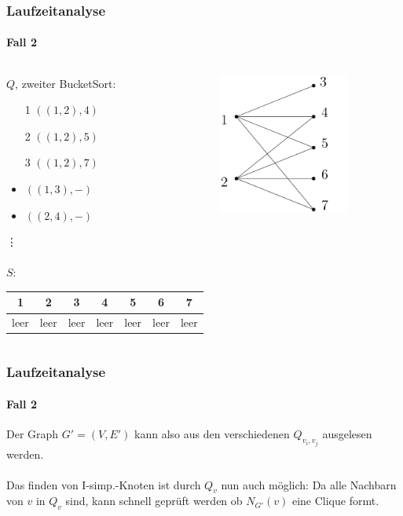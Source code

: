 \begin{frame}[t]
\frametitle{Laufzeitanalyse}
\framesubtitle{Fall 2}

\begin{columns}
	\begin{block}{$Q$, zweiter BucketSort:}
		\begin{itemize}
			\item[1] $((1,2), 4)$
			\item[2] $((1,2), 5)$
			\item[3] $((1,2), 7)$
			\item $((1,3), -)$
			\item $((2,4), -)$
		\end{itemize}
	\vdots
	\ \\
	\ \\
	$S$: \\
	\begin{tabular}{| c | c | c | c | c | c | c |}
		\hline
		1 & 2 & 3 & 4 & 5 & 6 & 7 \\
		\hline
		{\scriptsize leer} & {\scriptsize leer} & {\scriptsize leer} & {\scriptsize leer} & {\scriptsize leer} & {\scriptsize leer} & {\scriptsize leer} \\
		\hline
	\end{tabular}
	\end{block}
	
	\includegraphics[width=0.7\textwidth]{images/Graph_Queue_1.png}
\end{columns}
\end{frame}


\begin{frame}
\frametitle{Laufzeitanalyse}
\framesubtitle{Fall 2}

Der Graph $G' = (V,E')$ kann also aus den verschiedenen $Q_{v_i,v_j}$ ausgelesen werden. \\
\ \\
Das finden von I-simp.-Knoten ist durch $Q_v$ nun auch möglich: Da alle Nachbarn von $v$ in $Q_v$ sind, kann schnell geprüft werden ob $N_{G'}(v)$ eine Clique formt.

\end{frame}



